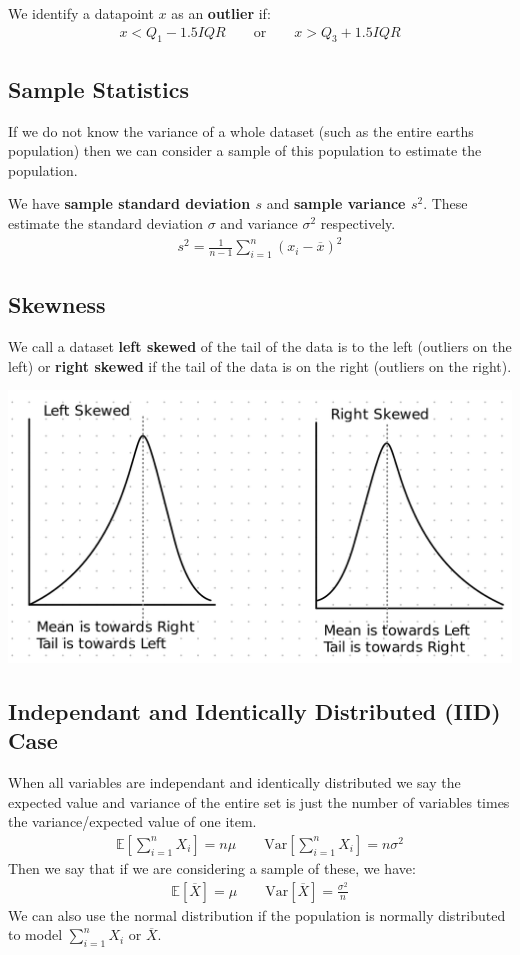 \documentclass[12pt,letterpaper]{article} \usepackage{amsmath} \usepackage{graphicx} \usepackage[margin=1in]{geometry} \usepackage{longtable}  \usepackage{amssymb}
\begin{document}
	We identify a datapoint $x$ as an \textbf{outlier} if:
	\begin{align*}
		x < Q_1 - 1.5IQR \qquad \text{or} \qquad x>Q_3 + 1.5IQR
	\end{align*}

	\subsection{Sample Statistics}
	If we do not know the variance of a whole dataset (such as the entire earths population) then we can consider a sample of this population to estimate the population. 
	
	We have \textbf{sample standard deviation $s$} and \textbf{sample variance $s^2$}. These estimate the standard deviation $\sigma$ and variance $\sigma^2$ respectively. 
	\begin{align*}
		s^2 = \frac{1}{n-1}\sum^{n}_{i=1}(x_i - \overline x)^2
	\end{align*}

	\subsection{Skewness}
	We call a dataset \textbf{left skewed} of the tail of the data is to the left (outliers on the left) or \textbf{right skewed} if the tail of the data is on the right (outliers on the right).
	\begin{center}
		\includegraphics[width=0.6\linewidth]{skew}
	\end{center}

	\subsection{Independant and Identically Distributed (IID) Case}
	When all variables are independant and identically distributed we say the expected value and variance of the entire set is just the number of variables times the variance/expected value of one item.
	\begin{align*}
		\mathbb E\left[\sum_{i=1}^{n}X_i\right]=n\mu \qquad \text{Var}\left[\sum_{i=1}^{n}X_i\right]=n\sigma^2
	\end{align*}
	Then we say that if we are considering a sample of these, we have:
	\begin{align*}
		\mathbb E [\overline X] = \mu \qquad \text{Var} [\overline X] = \frac{\sigma^2}{n}
	\end{align*}
	We can also use the normal distribution if the population is normally distributed to model $\sum_{i=1}^n X_i$ or $\overline X$.
	
\end{document}
